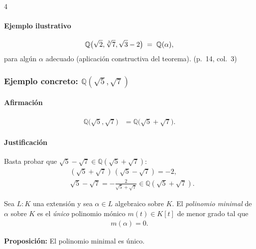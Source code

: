 \documentclass[landscape,a4paper]{article}
\begin{document}
\begin{multicols}{4}
\paragraph{Ejemplo ilustrativo}
\begin{align*}
   \mathbb{Q}\bigl(\sqrt{2},\root 3 \of 7,\sqrt{3}-2\bigr) 
    \;=\; \mathbb{Q}(\alpha),
\end{align*}
para algún $\alpha$ adecuado (aplicación constructiva del teorema). (p.~14, col.~3)

\subsubsection*{Ejemplo concreto: $\mathbb{Q}(\sqrt5,\sqrt7)$}

\paragraph{Afirmación}
\begin{align*}
   \mathbb{Q}\bigl(\sqrt5,\sqrt7\bigr) 
     &= \mathbb{Q}\bigl(\sqrt5+\sqrt7\bigr).
\end{align*}

\paragraph{Justificación}
Basta probar que $\sqrt5-\sqrt7\in\mathbb{Q}(\sqrt5+\sqrt7)$:
\begin{align*}
   &(\sqrt5+\sqrt7)\,(\sqrt5-\sqrt7) = -2,\\
   &\sqrt5-\sqrt7 = -\frac{2}{\sqrt5+\sqrt7}\in\mathbb{Q}(\sqrt5+\sqrt7).
\end{align*}
\begin{tcolorbox}[colback=white,colframe=blue!80!black,colbacktitle=blue!80!black,coltitle=white,title={Definición: Polinomio minimal (p.~11, col.~1)}]
Sea $L:K$ una extensión y sea $\alpha \in L$ algebraico sobre $K$. El \emph{polinomio minimal} de $\alpha$ sobre $K$ es el \emph{único} polinomio mónico $m(t) \in K[t]$ de menor grado tal que
\begin{align*}
m(\alpha) = 0.
\end{align*}
\end{tcolorbox}

\noindent \textbf{Proposición:} El polinomio minimal es único.\\


\end{multicols}
\end{document}

